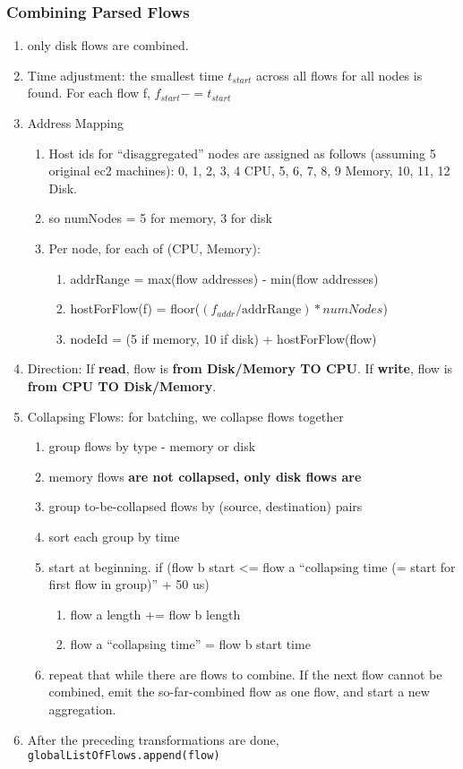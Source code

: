 \subsubsection{Combining Parsed Flows}
\begin{enumerate}
\item only disk flows are combined.
\item Time adjustment: the smallest time $t_{start}$ across all flows for all nodes is found. For each flow f, $f_{start} -= t_{start}$
\item Address Mapping
    \begin{enumerate}
    \item Host ids for ``disaggregated'' nodes are assigned as follows (assuming 5 original ec2 machines): 0, 1, 2, 3, 4 CPU, 5, 6, 7, 8, 9 Memory, 10, 11, 12 Disk.
    \item so numNodes = 5 for memory, 3 for disk
    \item Per node, for each of (CPU, Memory):
        \begin{enumerate}
        \item addrRange = max(flow addresses) - min(flow addresses)
        \item hostForFlow(f) = floor($(f_{addr} / \text{addrRange}) * numNodes$)
        \item nodeId = (5 if memory, 10 if disk) + hostForFlow(flow)
        \end{enumerate}
    \end{enumerate}
\item Direction: If \textbf{read}, flow is \textbf{from Disk/Memory TO CPU}. If \textbf{write}, flow is \textbf{from CPU TO Disk/Memory}.
\item Collapsing Flows: for batching, we collapse flows together
    \begin{enumerate}
    \item group flows by type - memory or disk
    \item memory flows \textbf{are not collapsed, only disk flows are}
    \item group to-be-collapsed flows by (source, destination) pairs
    \item sort each group by time
    \item start at beginning. if (flow b start <= flow a ``collapsing time (= start for first flow in group)'' + 50 us)
        \begin{enumerate}
        \item flow a length += flow b length
        \item flow a ``collapsing time'' = flow b start time
        \end{enumerate}
    \item repeat that while there are flows to combine. If the next flow cannot be combined, emit the so-far-combined flow as one flow, and start a new aggregation.
    \end{enumerate}
\item After the preceding transformations are done, \texttt{globalListOfFlows.append(flow)}
\end{enumerate}

